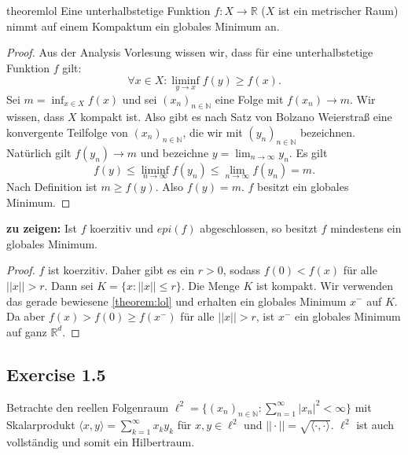 \documentclass[a4paper, landscape,twocolumn,fontsize=9pt]{scrartcl}
\begin{document}
\begin{theorem}{theorem}{lol}
Eine unterhalbstetige Funktion $f: X \to \mathbb R$ ($X$ ist ein metrischer Raum) nimmt auf einem Kompaktum ein globales Minimum an.
\end{theorem}
\begin{proof}
Aus der Analysis Vorlesung wissen wir, dass für eine unterhalbstetige Funktion $f$ gilt:
\[
	\forall x \in X: \liminf_{y \to x} f(y) \geq f(x). 
\]
Sei $m = \inf_{x \in X}f(x)$ und sei $(x_n)_{n \in \mathbb N}$ eine Folge mit $f(x_n) \to m$. Wir wissen, dass $X$ kompakt ist. Also gibt es nach Satz von Bolzano Weierstraß eine konvergente Teilfolge von $(x_n)_{n \in \mathbb N}$, die wir mit $(y_{n})_{n \in \mathbb N}$ bezeichnen. Natürlich gilt $f(y_n) \to m$ und bezeichne $y = \lim_{n \to \infty} y_n$. Es gilt
\[
	f(y) \leq \liminf_{n \to \infty}f(y_n) \leq \lim_{n \to \infty} f(y_n) = m.
\]
Nach Definition ist $m \geq f(y)$. Also $f(y) = m$. $f$ besitzt ein globales Minimum.
\end{proof}

\textbf{zu zeigen:} Ist $f$ koerzitiv und $epi(f)$ abgeschlossen, so besitzt $f$ mindestens ein globales Minimum.

\begin{proof}
$f$ ist koerzitiv. Daher gibt es ein $r > 0$, sodass $f(0) < f(x)$ für alle $||x|| > r$. Dann sei $K = \{ x : || x || \leq r \}$. Die Menge $K$ ist kompakt. Wir verwenden das gerade bewiesene  \cref{theorem:lol} und erhalten ein globales Minimum $x^-$ auf $K$. Da aber $f(x) > f(0) \geq f(x^-)$ für alle $||x|| > r$, ist $x^-$ ein globales Minimum auf ganz $\mathbb R^d$. 
\end{proof}

\subsection*{Exercise 1.5}
Betrachte den reellen Folgenraum $\ell^2 = \{ (x_n)_{n \in \mathbb N} : \sum_{n=1}^{\infty} |x_n|^2 < \infty \}$ mit Skalarprodukt $\langle x,y \rangle = \sum^\infty_{k=1} x_ky_k$ für $x,y \in \ell^2$ und $||\cdot|| = \sqrt{\langle \cdot,\cdot \rangle}$. $\ell^2$ ist auch vollständig und somit ein Hilbertraum.
\end{document}
